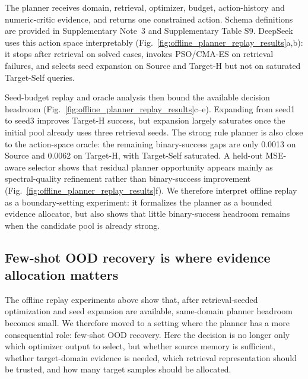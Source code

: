 \documentclass[final,1p,times]{elsarticle}
\begin{document}
The planner receives domain, retrieval, optimizer, budget, action-history and numeric-critic evidence, and returns one constrained action. Schema definitions are provided in Supplementary Note~3 and Supplementary Table S9. DeepSeek uses this action space interpretably (Fig.~\ref{fig:offline_planner_replay_results}a,b): it stops after retrieval on solved cases, invokes PSO/CMA-ES on retrieval failures, and selects seed expansion on Source and Target-H but not on saturated Target-Self queries.


Seed-budget replay and oracle analysis then bound the available decision headroom (Fig.~\ref{fig:offline_planner_replay_results}c--e). Expanding from seed1 to seed3 improves Target-H success, but expansion largely saturates once the initial pool already uses three retrieval seeds. The strong rule planner is also close to the action-space oracle: the remaining binary-success gaps are only 0.0013 on Source and 0.0062 on Target-H, with Target-Self saturated. A held-out MSE-aware selector shows that residual planner opportunity appears mainly as spectral-quality refinement rather than binary-success improvement (Fig.~\ref{fig:offline_planner_replay_results}f). We therefore interpret offline replay as a boundary-setting experiment: it formalizes the planner as a bounded evidence allocator, but also shows that little binary-success headroom remains when the candidate pool is already strong.






\subsection{Few-shot OOD recovery is where evidence allocation matters}

The offline replay experiments above show that, after retrieval-seeded optimization and seed expansion are available, same-domain planner headroom becomes small. We therefore moved to a setting where the planner has a more consequential role: few-shot OOD recovery. Here the decision is no longer only which optimizer output to select, but whether source memory is sufficient, whether target-domain evidence is needed, which retrieval representation should be trusted, and how many target samples should be allocated.
\end{document}
